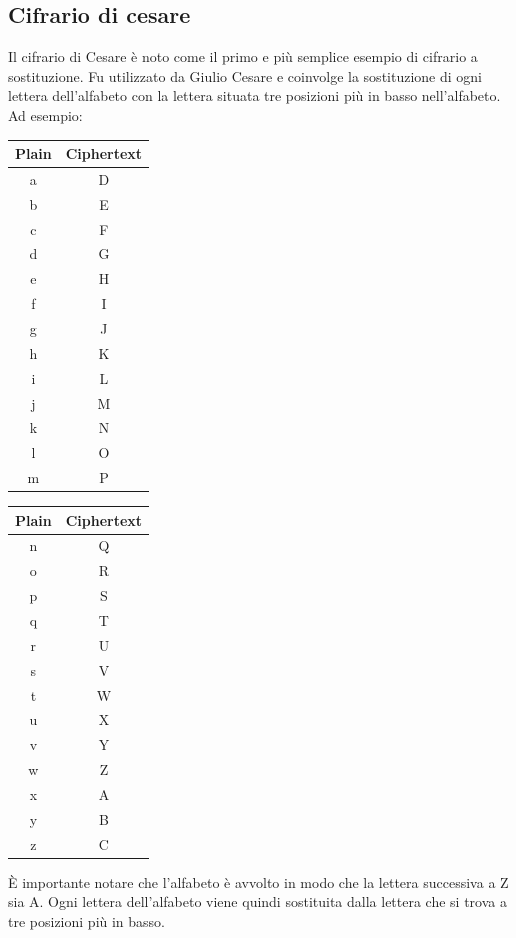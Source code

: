 \subsection{Cifrario di cesare}
Il cifrario di Cesare è noto come il primo e più semplice esempio di
cifrario a sostituzione. Fu utilizzato da Giulio Cesare e coinvolge la
sostituzione di ogni lettera dell'alfabeto con la lettera situata tre
posizioni più in basso nell'alfabeto. Ad esempio:

\begin{center}
\begin{tabular}{|c|c|}
\hline
\textbf{Plain} & \textbf{Ciphertext} \\
\hline
a & D \\
b & E \\
c & F \\
d & G \\
e & H \\
f & I \\
g & J \\
h & K \\
i & L \\
j & M \\
k & N \\
l & O \\
m & P \\
\hline
\end{tabular}
\hspace{2cm}
\begin{tabular}{|c|c|}
\hline
\textbf{Plain} & \textbf{Ciphertext} \\
\hline
n & Q \\
o & R \\
p & S \\
q & T \\
r & U \\
s & V \\
t & W \\
u & X \\
v & Y \\
w & Z \\
x & A \\
y & B \\
z & C \\
\hline
\end{tabular}
\end{center}

È importante notare che l'alfabeto è avvolto in modo che la lettera
successiva a Z sia A. Ogni lettera dell'alfabeto viene quindi sostituita
dalla lettera che si trova a tre posizioni più in basso.

